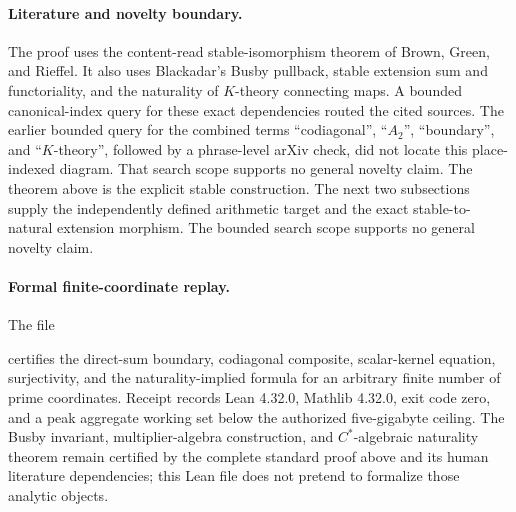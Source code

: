 \paragraph{Literature and novelty boundary.}
The proof uses the content-read stable-isomorphism theorem of Brown, Green, and
Rieffel.  It also uses Blackadar's Busby pullback, stable extension sum and
functoriality, and the naturality of $K$-theory connecting maps.  A bounded canonical-index query
for these exact dependencies routed the cited sources.  The earlier bounded
query for the combined terms ``codiagonal'', ``$A_2$'', ``boundary'', and
``$K$-theory'', followed by a phrase-level arXiv check, did not locate this
place-indexed diagram.  That search scope supports no general novelty claim.
The theorem above is the explicit stable construction.  The next two
subsections supply the independently defined arithmetic target and the exact
stable-to-natural extension morphism.  The bounded search scope supports no
general novelty claim.

\paragraph{Formal finite-coordinate replay.}
The file
\begin{center}
\footnotesize
{}
\end{center}
certifies the direct-sum boundary, codiagonal composite, scalar-kernel equation,
surjectivity, and the naturality-implied formula for an arbitrary finite number
of prime coordinates.  Receipt
 records Lean
4.32.0, Mathlib 4.32.0, exit code zero, and a peak aggregate working set below
the authorized five-gigabyte ceiling.  The Busby invariant, multiplier-algebra
construction, and $C^*$-algebraic naturality theorem remain certified by the
complete standard proof above and its human literature dependencies; this
Lean file does not pretend to formalize those analytic objects.
